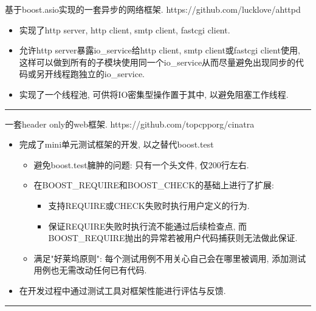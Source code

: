 \documentclass{resume}
\newcommand{\subsectionrule}{{\vspace{-8pt}\hspace{0.5cm}\rule[1pt]{\linewidth-1cm}{0.05pt}\vspace{-8pt}}}
\begin{document}
\begin{onehalfspacing}
基于boost.asio实现的一套异步的网络框架.
\newline
https://github.com/lucklove/ahttpd
\begin{itemize}
  \item 实现了http server, http client, smtp client, fastcgi client.
  \item 允许http server暴露io\_service给http client, smtp client或fastcgi client使用, 这样可以做到所有的子模块使用同一个io\_service从而尽量避免出现同步的代码或另开线程跑独立的io\_service.
  \item 实现了一个线程池, 可供将IO密集型操作置于其中, 以避免阻塞工作线程.
\end{itemize}
\end{onehalfspacing}

\subsectionrule

\begin{onehalfspacing}
一套header only的web框架. 
\newline
https://github.com/topcpporg/cinatra
\begin{itemize}
  \item 完成了mini单元测试框架的开发, 以之替代boost.test
  \begin{itemize}
    \item 避免boost.test臃肿的问题: 只有一个头文件, 仅200行左右.
    \item 在BOOST\_REQUIRE和BOOST\_CHECK的基础上进行了扩展:
    \begin{itemize}
        \item 支持REQUIRE或CHECK失败时执行用户定义的行为.
        \item 保证REQUIRE失败时执行流不能通过后续检查点, 而BOOST\_REQUIRE抛出的异常若被用户代码捕获则无法做此保证.
    \end{itemize}
    \item 满足"好莱坞原则": 每个测试用例不用关心自己会在哪里被调用, 添加测试用例也无需改动任何已有代码.
  \end{itemize}
  \item 在开发过程中通过测试工具对框架性能进行评估与反馈.
\end{itemize}
\end{onehalfspacing}

\subsectionrule
\end{document}
